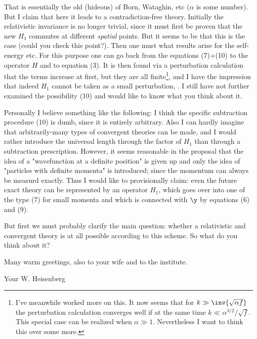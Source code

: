 That is essentially the old (hideous)  of Born, Wataghin, etc ($\alpha$ is some number). But I claim that here it leads to a  contradiction-free theory. Initially the relativistic invariance is no longer trivial, since it must first be proven that the new $H_1$ commutes at different \textit{spatial} points. But it seems to be that this is the case (could you check this point?). Then one must  what results arise for the self-energy etc. For this purpose one can go back from the equations (7)+(10) to the operator $H$ and to equation (3). It is then found via a perturbation calculation that the terms increase at first, but they are all finite\footnote{I've meanwhile worked more on this. It now seems that for $k\gg\inv{\sqrt{\alpha f}}$ the perturbation calculation converges well if at the same time $k\ll\alpha^{3/2}/\sqrt{f}$. This special case can be realized when $\alpha\gg 1$. Nevertheless I want to think this over some more.}, and I have the impression that indeed $H_1$ cannot be taken as a small perturbation, . I still have not further examined the possibility (10) and would like to know what you think about it.

Personally I believe something like the following: I think the specific subtraction procedure (10) is dumb, since it is entirely arbitrary. Also I can hardly imagine that arbitrarily-many types of convergent theories can be made, and I would rather introduce the universal length through the factor of $H_1$ than through a subtraction prescription. However, it seems reasonable in the proposal that the idea of a "wavefunction at a definite position" is given up and only the idea of "particles with definite momenta" is introduced; since the momentum can always be measurd exactly. Thus I would like to provisionally claim: even the future exact theory can be represented by an operator $H_1$, which goes over into one of the type (7) for small momenta and which is connected with $\y$ by equations (6) and (9).

But first we must probably clarify the main question: whether a relativistic and convergent theory is at all possible according to this scheme. So what do you think about it?

Many warm greetings, also to your wife and to the institute.

Your W. Heisenberg

 
